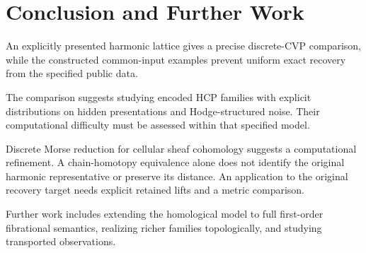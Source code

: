 \section*{Conclusion and Further Work}

An explicitly presented harmonic lattice gives a precise discrete-CVP comparison, while
the constructed common-input examples prevent uniform exact recovery from
the specified public data.


The comparison suggests studying encoded HCP families with explicit
distributions on hidden presentations and Hodge-structured noise. Their
computational difficulty must be assessed within that specified model.

Discrete Morse reduction for cellular sheaf cohomology
\cite{curryGhristNanda2015morse} suggests a computational refinement.
A chain-homotopy equivalence alone does not identify the original harmonic
representative or preserve its distance. An application to the original
recovery target needs explicit retained lifts and a metric comparison.

Further work includes extending the homological model to full first-order
fibrational semantics, realizing richer families topologically, and studying
transported observations.
